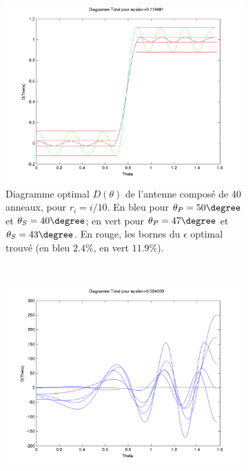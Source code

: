 \begin{figure}[h!]
  \centering
  \begin{subfigure}[b]{0.32\textwidth}
  \includegraphics[width=\textwidth]{D-ModLin.png}
  \caption{Diagramme optimal $D(\theta)$ de l'antenne composé de 40 anneaux, pour $r_i=i/10$. En bleu pour $\theta_P=50 \degree$ et $\theta_S=40 \degree$; en vert pour $\theta_P=47 \degree$ et $\theta_S=43 \degree$. En rouge, les bornes du $\epsilon$ optimal trouvé (en bleu $2.4 \%$, en vert $11.9 \%$).}
  \label{fig:D-ModLin}
  \end{subfigure}%
  ~ 
  \begin{subfigure}[b]{0.32\textwidth}
  \includegraphics[width=\textwidth]{D-ModLin-2RobustTau01.png}

\end{subfigure}
\end{figure}
